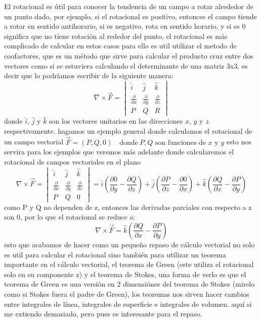 El rotacional es útil para conocer la tendencia de un campo a rotar alrededor de un punto dado, por ejemplo, 
si el rotacional es positivo, entonces el campo tiende a rotar en sentido antihorario, si es negativo, rota en sentido horario,
y si es 0 significa que no tiene rotación al rededor del punto, el rotacional es más complicado de calcular en estos casos
para ello es util utilizar el metodo de coofactores, que es un método que sirve para calcular el producto cruz entre dos vectores
como si se estuviera calculando el determinante de una matriz 3x3, es decir que lo podríamos escribir de la siguiente manera:
$$ \nabla \times \vec{F} =
\begin{vmatrix}
\hat{i} & \hat{j} & \hat{k} \\
\frac{\partial}{\partial x} & \frac{\partial}{\partial y} & \frac{\partial}{\partial z} \\
P & Q & R
\end{vmatrix} $$
donde $\hat{i}$, $\hat{j}$ y $\hat{k}$ son los vectores unitarios en las direcciones $x$, $y$ y $z$ respectivamente.
hagamos un ejemplo general donde calculamos el rotacional de un campo vectorial $ \vec{F} = \left( P, Q, 0 \right) \quad
\text{donde} \ P, Q \text{ son funciones de } x \text{ y } y $
esto nos servira para los ejemplos que veremos más adelante donde calcularemos  el  rotacional de campos vectoriales 
en el plano $$ \nabla \times \vec{F} =
\begin{vmatrix}
\hat{i} & \hat{j} & \hat{k} \\
\frac{\partial}{\partial x} & \frac{\partial}{\partial y} & \frac{\partial}{\partial z} \\
P & Q & 0
\end{vmatrix} = \hat{i}\left(\frac{\partial 0}{\partial y} - \frac{\partial Q}{\partial z}\right) + \hat{j}
\left(\frac{\partial P}{\partial z} - \frac{\partial 0}{\partial x}\right) + \hat{k}\left(\frac{\partial Q}{\partial x} 
- \frac{\partial P}{\partial y}\right)$$ como P y Q no dependen de z, entonces las derivadas parciales con respecto a z 
son 0, por lo que el rotacional se reduce a: $$ \nabla \times \vec{F} = \hat{k}\left(\frac{\partial Q}{\partial x} - 
\frac{\partial P}{\partial y}\right) $$
esto que acabamos de hacer como un pequeño repaso de cálculo vectorial no solo es util para calcular el rotacional sino
también para utilizar un teorema importante en el cálculo vectorial, el teorema de Green 
(este utiliza el rotacional solo en su componente z) y el teorema de Stokes, una forma 
de verlo es que el teorema de Green es una versión en 2 dimensiónes del teorema de Stokes (mirelo como si Stokes fuera
el padre de Green), los teoremas nos sirven hacer cambios entre integrales de línea, integrales de superficie e integrales 
de volumen. aquí si me extiendo demasiado, pero pues es interesante para el repaso.

